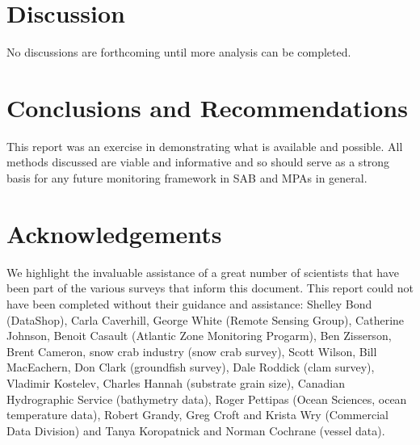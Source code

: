 \documentclass[letterpaper,portrait,11pt]{scrartcl}
\numberwithin{equation}{section}    %
\numberwithin{figure}{section}    %
\numberwithin{table}{section}       %
\begin{document}
\section{Discussion}
\label{sec:discussion}
No discussions are forthcoming until more analysis can be completed.

\section{Conclusions and Recommendations}
\label{sec:conclusions}


This report was an exercise in demonstrating what is available and possible. All methods discussed are viable and informative and so should serve as a strong basis for any future monitoring framework in SAB and MPAs in general.


\newpage
\section*{Acknowledgements}

We highlight the invaluable assistance of a great number of scientists that have been part of the various surveys that inform this document. This report could not have been completed without their guidance and assistance: Shelley Bond (DataShop), Carla Caverhill, George White (Remote Sensing Group), Catherine Johnson, Benoit Casault (Atlantic Zone Monitoring Progarm), Ben Zisserson, Brent Cameron, snow crab industry (snow crab survey), Scott Wilson, Bill MacEachern, Don Clark (groundfish survey), Dale Roddick (clam survey), Vladimir Kostelev, Charles Hannah (substrate grain size), Canadian Hydrographic Service (bathymetry data), Roger Pettipas (Ocean Sciences, ocean temperature data), Robert Grandy, Greg Croft and Krista Wry (Commercial Data Division) and Tanya Koropatnick and Norman Cochrane (vessel data).


\clearpage

\printbibliography
\end{document}
